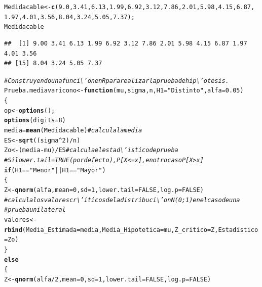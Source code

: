 \documentclass[12pt,letterpaper]{article}\usepackage[]{graphicx}\usepackage[]{color}
\makeatletter
\newcommand{\hlnum}[1]{\textcolor[rgb]{0.686,0.059,0.569}{#1}}%
\newcommand{\hlstr}[1]{\textcolor[rgb]{0.192,0.494,0.8}{#1}}%
\newcommand{\hlcom}[1]{\textcolor[rgb]{0.678,0.584,0.686}{\textit{#1}}}%
\newcommand{\hlopt}[1]{\textcolor[rgb]{0,0,0}{#1}}%
\newcommand{\hlstd}[1]{\textcolor[rgb]{0.345,0.345,0.345}{#1}}%
\newcommand{\hlkwa}[1]{\textcolor[rgb]{0.161,0.373,0.58}{\textbf{#1}}}%
\newcommand{\hlkwb}[1]{\textcolor[rgb]{0.69,0.353,0.396}{#1}}%
\newcommand{\hlkwc}[1]{\textcolor[rgb]{0.333,0.667,0.333}{#1}}%
\newcommand{\hlkwd}[1]{\textcolor[rgb]{0.737,0.353,0.396}{\textbf{#1}}}%
\newenvironment{kframe}{%
 \def\at@end@of@kframe{}%
 \ifinner\ifhmode%
  \def\at@end@of@kframe{\end{minipage}}%
  \begin{minipage}{\columnwidth}%
 \fi\fi%
 \def\FrameCommand##1{\hskip\@totalleftmargin \hskip-\fboxsep
 \colorbox{shadecolor}{##1}\hskip-\fboxsep
     \hskip-\linewidth \hskip-\@totalleftmargin \hskip\columnwidth}%
 \MakeFramed {\advance\hsize-\width
   \@totalleftmargin\z@ \linewidth\hsize
   \@setminipage}}%
 {\par\unskip\endMakeFramed%
 \at@end@of@kframe}
\newenvironment{knitrout}{}{} %
\makeatother
\begin{document}
\begin{knitrout}
\color{fgcolor}\begin{kframe}
\begin{alltt}
\hlstd{Medidacable} \hlkwb{<-} \hlkwd{c}\hlstd{(}\hlnum{9.0}\hlstd{,} \hlnum{3.41}\hlstd{,} \hlnum{6.13}\hlstd{,} \hlnum{1.99}\hlstd{,} \hlnum{6.92}\hlstd{,} \hlnum{3.12}\hlstd{,} \hlnum{7.86}\hlstd{,} \hlnum{2.01}\hlstd{,} \hlnum{5.98}\hlstd{,} \hlnum{4.15}\hlstd{,} \hlnum{6.87}\hlstd{,}
                 \hlnum{1.97}\hlstd{,} \hlnum{4.01}\hlstd{,} \hlnum{3.56}\hlstd{,} \hlnum{8.04}\hlstd{,} \hlnum{3.24}\hlstd{,} \hlnum{5.05}\hlstd{,} \hlnum{7.37}\hlstd{);}
\hlstd{Medidacable}
\end{alltt}
\begin{verbatim}
##  [1] 9.00 3.41 6.13 1.99 6.92 3.12 7.86 2.01 5.98 4.15 6.87 1.97 4.01 3.56
## [15] 8.04 3.24 5.05 7.37
\end{verbatim}
\begin{alltt}
\hlcom{# Construyendo una funci\textbackslash{}'on en R para realizar la prueba de hip\textbackslash{}'otesis.}
\hlstd{Prueba.mediavaricono} \hlkwb{<-} \hlkwa{function}\hlstd{(}\hlkwc{mu}\hlstd{,} \hlkwc{sigma}\hlstd{,} \hlkwc{n}\hlstd{,} \hlkwc{H1}\hlstd{=}\hlstr{"Distinto"}\hlstd{,} \hlkwc{alfa}\hlstd{=}\hlnum{0.05}\hlstd{)}
\hlstd{\{}
\hlstd{op} \hlkwb{<-} \hlkwd{options}\hlstd{();}
\hlkwd{options}\hlstd{(}\hlkwc{digits}\hlstd{=}\hlnum{8}\hlstd{)}
\hlstd{media}\hlkwb{=}\hlkwd{mean}\hlstd{(Medidacable)} \hlcom{#calcula la media }
\hlstd{ES} \hlkwb{<-} \hlkwd{sqrt}\hlstd{((sigma}\hlopt{^}\hlnum{2}\hlstd{)}\hlopt{/}\hlstd{n)}
\hlstd{Zo} \hlkwb{<-} \hlstd{(media}\hlopt{-}\hlstd{mu)}\hlopt{/}\hlstd{ES} \hlcom{#calcula el estad\textbackslash{}'istico de prueba }
\hlcom{# Si lower.tail = TRUE (por defecto), P[X <= x], en otro caso P[X > x] }
\hlkwa{if} \hlstd{(H1} \hlopt{==} \hlstr{"Menor"} \hlopt{||} \hlstd{H1} \hlopt{==} \hlstr{"Mayor"}\hlstd{)}
\hlstd{\{}
\hlstd{Z} \hlkwb{<-} \hlkwd{qnorm}\hlstd{(alfa,} \hlkwc{mean}\hlstd{=}\hlnum{0}\hlstd{,} \hlkwc{sd}\hlstd{=}\hlnum{1}\hlstd{,} \hlkwc{lower.tail} \hlstd{=} \hlnum{FALSE}\hlstd{,} \hlkwc{log.p} \hlstd{=} \hlnum{FALSE}\hlstd{)}
\hlcom{# calcula los valores cr\textbackslash{}'iticos de la distribuci\textbackslash{}'on N(0;1) en el caso de una }
\hlcom{# prueba unilateral }
\hlstd{valores} \hlkwb{<-} \hlkwd{rbind}\hlstd{(}\hlkwc{Media_Estimada}\hlstd{=media,} \hlkwc{Media_Hipotetica}\hlstd{=mu,} \hlkwc{Z_critico}\hlstd{=Z,}\hlkwc{Estadistico}\hlstd{= Zo)}
\hlstd{\}}
\hlkwa{else}
\hlstd{\{}
\hlstd{Z} \hlkwb{<-} \hlkwd{qnorm}\hlstd{(alfa}\hlopt{/}\hlnum{2}\hlstd{,} \hlkwc{mean}\hlstd{=}\hlnum{0}\hlstd{,} \hlkwc{sd}\hlstd{=}\hlnum{1}\hlstd{,} \hlkwc{lower.tail} \hlstd{=} \hlnum{FALSE}\hlstd{,} \hlkwc{log.p} \hlstd{=} \hlnum{FALSE}\hlstd{)}

\end{alltt}
\end{kframe}
\end{knitrout}
\end{document}
